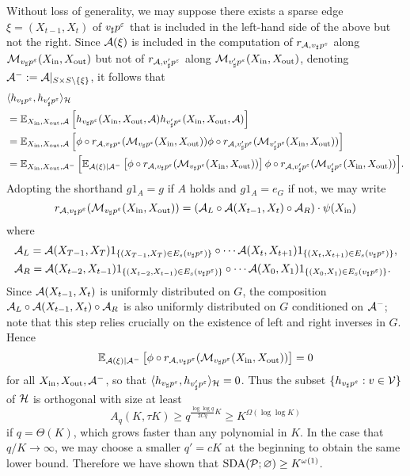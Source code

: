 Without loss of generality, we may suppose there exists a sparse edge $\xi = (X_{t-1},X_t)$ of $v_\sharp p^\varepsilon$ that is included in the left-hand side of the above but not the right. Since $\mathcal{A}(\xi)$ is included in the computation of $r_{\mathcal{A},v_\sharp p^\varepsilon}$ along $\mathcal{M}_{v_\sharp p^\varepsilon}(X_{\operatorname{in}},X_{\operatorname{out}})$ but not of $r_{\mathcal{A},v_\sharp' p^\varepsilon}$ along $\mathcal{M}_{v_\sharp' p^\varepsilon}(X_{\operatorname{in}},X_{\operatorname{out}})$, denoting $\mathcal{A}^-:= \mathcal{A}|_{S\times S\setminus\{\xi\}}$, it follows that
\begin{align*}
&\langle h_{v_\sharp p^\varepsilon}, h_{v'_\sharp p^\varepsilon}\rangle_{\mathcal{H}}\\
&=
\mathbb{E}_{X_{\operatorname{in}},X_{\operatorname{out}},\mathcal{A}}\left[h_{v_\sharp p^\varepsilon}(X_{\operatorname{in}},X_{\operatorname{out}},\mathcal{A}) h_{v'_\sharp p^\varepsilon}(X_{\operatorname{in}},X_{\operatorname{out}},\mathcal{A})\right]\\
&= \mathbb{E}_{X_{\operatorname{in}},X_{\operatorname{out}},\mathcal{A}}\left[\phi\circ r_{\mathcal{A},v_\sharp p^\varepsilon}(\mathcal{M}_{v_\sharp p^\varepsilon}(X_{\operatorname{in}},X_{\operatorname{out}})) \phi\circ r_{\mathcal{A},v'_\sharp p^\varepsilon}(\mathcal{M}_{v_\sharp' p^\varepsilon}(X_{\operatorname{in}},X_{\operatorname{out}}))\right]\\
&= \mathbb{E}_{X_{\operatorname{in}},X_{\operatorname{out}},\mathcal{A}^-}\left[\mathbb{E}_{\mathcal{A}(\xi)|\mathcal{A}^-}\left[\phi\circ r_{\mathcal{A},v_\sharp p^\varepsilon}(\mathcal{M}_{v_\sharp p^\varepsilon}(X_{\operatorname{in}},X_{\operatorname{out}}))\right] \phi\circ r_{\mathcal{A},v'_\sharp p^\varepsilon}(\mathcal{M}_{v_\sharp' p^\varepsilon}(X_{\operatorname{in}},X_{\operatorname{out}}))\right]\!.
\end{align*}
Adopting the shorthand $g1_A = g$ if $A$ holds and $g1_A = e_G$ if not, we may write
\begin{equation*}
r_{\mathcal{A},v_\sharp p^\varepsilon}(\mathcal{M}_{v_\sharp p^\varepsilon}(X_{\operatorname{in}},X_{\operatorname{out}})) = \left(\mathcal{A}_L\circ \mathcal{A}(X_{t-1},X_t) \circ\mathcal{A}_R \right) \cdot \psi(X_{\operatorname{in}})
\end{equation*}
where
\begin{align*}
& \mathcal{A}_L = \mathcal{A}(X_{T-1},X_T) 1_{\{(X_{T-1},X_T)\in E_s(v_\sharp p^\varepsilon)\}} \circ\cdots \mathcal{A}(X_{t},X_{t+1}) 1_{\{(X_{t},X_{t+1})\in E_s(v_\sharp p^\varepsilon)\}},\\
& \mathcal{A}_R = \mathcal{A}(X_{t-2},X_{t-1}) 1_{\{(X_{t-2},X_{t-1})\in E_s(v_\sharp p^\varepsilon)\}} \circ\cdots \mathcal{A}(X_0,X_1) 1_{\{(X_0,X_1)\in E_s(v_\sharp p^\varepsilon)\}}.
\end{align*}
Since $\mathcal{A}(X_{t-1},X_t)$ is uniformly distributed on $G$, the composition $\mathcal{A}_L\circ \mathcal{A}(X_{t-1},X_t) \circ\mathcal{A}_R$ is also uniformly distributed on $G$ conditioned on $\mathcal{A}^-$; note that this step relies crucially on the existence of left and right inverses in $G$. Hence
\begin{equation*}
\mathbb{E}_{\mathcal{A}(\xi)|\mathcal{A}^-}\left[\phi\circ r_{\mathcal{A},v_\sharp p^\varepsilon}(\mathcal{M}_{v_\sharp p^\varepsilon}(X_{\operatorname{in}},X_{\operatorname{out}}))\right] = 0
\end{equation*}
for all $X_{\operatorname{in}},X_{\operatorname{out}},\mathcal{A}^-$, so that $\langle h_{v_\sharp p^\varepsilon}, h_{v'_\sharp p^\varepsilon}\rangle_{\mathcal{H}} = 0$. Thus the subset $\{h_{v_\sharp p^\varepsilon}:v\in\mathcal{V}\}$ of $\mathcal{H}$ is orthogonal with size at least
\begin{equation*}
A_q\left(K,\tau K\right) \ge q^{\frac{\log\log q}{2Cq}K} \ge K^{\Omega(\log\log K)}
\end{equation*}
if $q = \Theta(K)$, which grows faster than any polynomial in $K$. In the case that $q/K\to\infty$, we may choose a smaller $q'=cK$ at the beginning to obtain the same lower bound. Therefore we have shown that $\operatorname{SDA}(\mathcal{P};\varnothing) \ge K^{\omega(1)}$.


